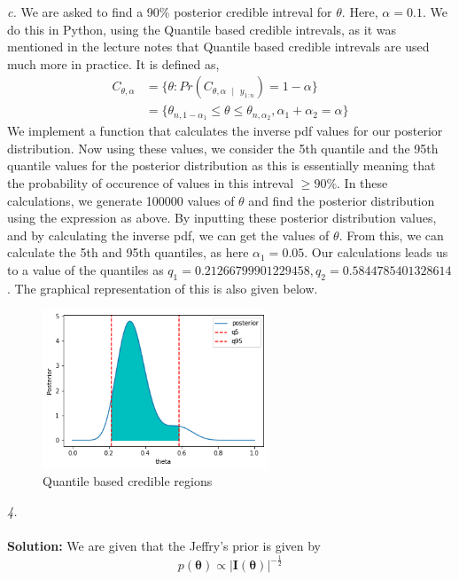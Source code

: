 \documentclass[11pt]{article}
\begin{document}
\noindent \emph{c.} We are asked to find a 90\% posterior credible intreval for $\theta$. Here, $\alpha = 0.1$. We do this in Python, using the Quantile based credible intrevals, as it was mentioned in the lecture notes that Quantile based credible intrevals are used much more in practice. It is defined as,
\begin{equation}
  \nonumber
  \begin{aligned}
    C_{\theta, \alpha} & = \{\theta : Pr(C_{\theta, \alpha \text{ }|\text{ } y_{1:n}}) = 1 - \alpha\}\\
    & = \{\theta_{n, 1 - \alpha_{1}} \leq \theta \leq \theta_{n, \alpha_{2}}, \alpha_{1} + \alpha_{2} = \alpha\}
  \end{aligned}
\end{equation}
We implement a function that calculates the inverse pdf values for our posterior distribution. Now using these values, we consider the 5th quantile and the 95th quantile values for the posterior distribution as this is essentially meaning that the probability of occurence of values in this intreval $\geq 90\%$. In these calculations, we generate 100000 values of $\theta$ and find the posterior distribution using the expression as above. By inputting these posterior distribution values, and by calculating the inverse pdf, we can get the values of $\theta$. From this, we can calculate the 5th and 95th quantiles, as here $\alpha_{1} = 0.05$. Our calculations leads us to a value of the quantiles as $q_{1} = 0.21266799901229458, q_{2} = 0.5844785401328614$. The graphical representation of this is also given below.
\begin{figure}[H]
  \centering
  \includegraphics[width = 0.6\textwidth]{q3c.png}
  \caption{Quantile based credible regions}
\end{figure}
\noindent \emph{4.}\\ \\
\textbf{Solution:}
We are given that the Jeffry's prior is given by
\begin{equation}
  \nonumber
  p(\bm{\theta}) \propto |\mathbf{I}(\bm{\theta})|^{-\frac{1}{2}}
\end{equation}
\end{document}
